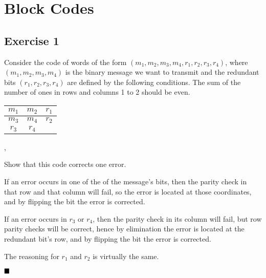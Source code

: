 \section{Block Codes}

\subsection{Exercise 1}

\begin{formulationBox}
	Consider the code of words of the form $(m_1, m_2, m_3, m_4, r_1, r_2, r_3, r_4)$, where $(m_1, m_2, m_3, m_4)$ is the binary message we want to transmit and the redundant bits $(r_1, r_2, r_3, r_4)$ are defined by the following conditions. The sum of the number of ones in rows and columns 1 to 2 should be even.
	
	\begin{center}
		\begin{tabular}{|c|c|c|}
			\hline
			$m_1$ & $m_2$ & $r_1$\\
			\hline
			$m_3$ & $m_4$ & $r_2$\\
			\hline
			$r_3$ & $r_4$ \\
			\cline{1-2}
		\end{tabular},
	\end{center}
	
	Show that this code corrects one error.
\end{formulationBox}

If an error occurs in one of the of the message's bits, then the parity check in that row and that column will fail, so the error is located at those coordinates, and by flipping the bit the error is corrected.

If an error occurs in $r_3$ or $r_4$, then the parity check in its column will fail, but row parity checks will be correct, hence by elimination the error is located at the redundant bit's row, and by flipping the bit the error is corrected.

The reasoning for $r_1$ and $r_2$ is virtually the same.

$\qed$
